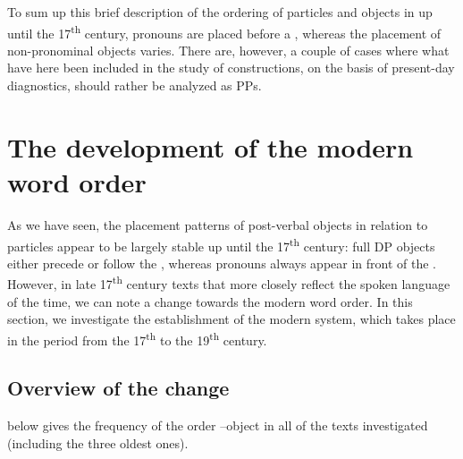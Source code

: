 \documentclass[output=paper]{langscibook}
\begin{document}
To sum up this brief description of the ordering of particles and objects in  up until the 17\textsuperscript{th} century, pronouns are placed before a , whereas the placement of non-pronominal objects varies. There are, however, a couple of cases where what have here been included in the study of  constructions, on the basis of present-day diagnostics, should rather be analyzed as PPs. 


\section{The development of the modern word order}\label{sec:lalu:5}


As we have seen, the placement patterns of post-verbal objects in relation to particles appear to be largely stable up until the 17\textsuperscript{th} century: full DP objects either precede or follow the , whereas pronouns always appear in front of the . However, in late 17\textsuperscript{th} century texts that more closely reflect the spoken language of the time, we can note a change towards the modern word order. In this section, we investigate the establishment of the modern system, which takes place in the period from the 17\textsuperscript{th} to the 19\textsuperscript{th} century.


\subsection{Overview of the change}\label{sec:lalu:5.1}

 below gives the frequency of the order –object in all of the texts investigated (including the three oldest ones).
\end{document}
